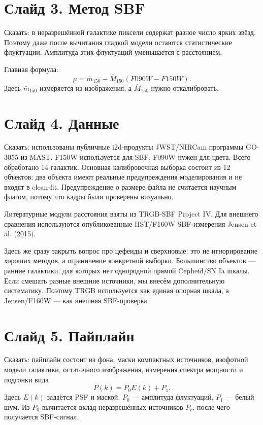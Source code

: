 \documentclass[12pt]{article}
\begin{document}
\section*{Слайд 3. Метод SBF}

Сказать: в неразрешённой галактике пиксели содержат разное число ярких звёзд. Поэтому даже после вычитания гладкой модели остаются статистические флуктуации. Амплитуда этих флуктуаций уменьшается с расстоянием.

Главная формула:
\begin{equation*}
    \mu = \bar{m}_{150} - \bar{M}_{150}(F090W-F150W).
\end{equation*}
Здесь $\bar{m}_{150}$ измеряется из изображения, а $\bar{M}_{150}$ нужно откалибровать.

\section*{Слайд 4. Данные}

Сказать: использованы публичные i2d-продукты JWST/NIRCam программы GO-3055 из MAST. F150W используется для SBF, F090W нужен для цвета. Всего обработано 14 галактик. Основная калибровочная выборка состоит из 12 объектов: два объекта имеют реальные предупреждения моделирования и не входят в clean-fit. Предупреждение о размере файла не считается научным флагом, потому что кадры были проверены визуально.

Литературные модули расстояния взяты из TRGB-SBF Project IV. Для внешнего сравнения используются опубликованные HST/F160W SBF-измерения Jensen et al. (2015).

Здесь же сразу закрыть вопрос про цефеиды и сверхновые: это не игнорирование хороших методов, а ограничение конкретной выборки. Большинство объектов --- ранние галактики, для которых нет однородной прямой Cepheid/SN Ia шкалы. Если смешать разные внешние источники, мы внесём дополнительную систематику. Поэтому TRGB используется как единая опорная шкала, а Jensen/F160W --- как внешняя SBF-проверка.

\section*{Слайд 5. Пайплайн}

Сказать: пайплайн состоит из фона, маски компактных источников, изофотной модели галактики, остаточного изображения, измерения спектра мощности и подгонки вида
\begin{equation*}
    P(k)=P_0E(k)+P_1.
\end{equation*}
Здесь $E(k)$ задаётся PSF и маской, $P_0$ --- амплитуда флуктуаций, $P_1$ --- белый шум. Из $P_0$ вычитается вклад неразрешённых источников $P_r$, после чего получается SBF-сигнал.
\end{document}
